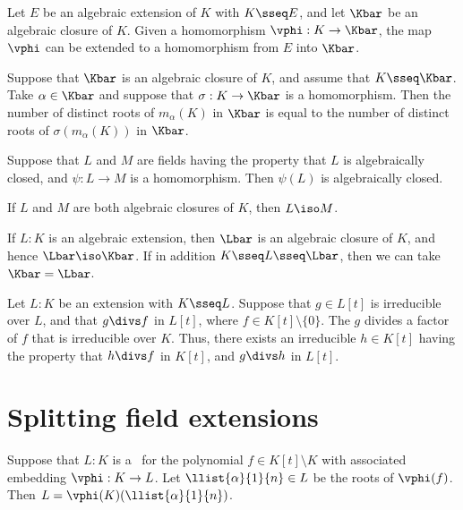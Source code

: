 \documentclass{article}
\begin{document}
  \begin{theorem}
    Let $E$ be an algebraic extension of $K$ with $K\sseq E$, and let $\Kbar$ be an algebraic closure of $K$. Given a homomorphism $\vphi:K\to \Kbar$, the map $\vphi$ can be extended to a homomorphism from $E$ into $\Kbar$.
  \end{theorem}

  \begin{corollary}
    Suppose that $\Kbar$ is an algebraic closure of $K$, and assume that $K\sseq \Kbar$. Take $\alpha\in \Kbar$ and suppose that $\sigma:K\to \Kbar$ is a homomorphism. Then the number of distinct roots of $m_\alpha(K)$ in $\Kbar$ is equal to the number of distinct roots of $\sigma(m_\alpha(K))$ in $\Kbar$.
  \end{corollary}

  \begin{proposition}
    Suppose that $L$ and $M$ are fields having the property that $L$ is algebraically closed, and $\psi : L \to M $ is a homomorphism. Then $\psi(L)$ is algebraically closed.
  \end{proposition}

  \begin{proposition}
    If $L$ and $M$ are both algebraic closures of $K$, then $L \iso M$.
  \end{proposition}

  \begin{proposition}
    If $L:K$ is an algebraic extension, then $\Lbar$ is an algebraic closure of $K$, and hence $\Lbar\iso\Kbar$. If in addition $K\sseq L\sseq \Lbar$, then we can take $\Kbar = \Lbar$.
  \end{proposition}

  \begin{proposition}
    Let $L:K$ be an extension with $K\sseq L$. Suppose that $g\in L[t]$ is irreducible over $L$, and that $g\divs f$ in $L[t]$, where $f\in K[t]\setminus \{ 0 \}$. The $g$ divides a factor of $f$ that is irreducible over $K$. Thus, there exists an irreducible $h\in K[t]$ having the property that $h\divs f$ in $K[t]$, and $g\divs h$ in $L[t]$.
  \end{proposition}

\section{Splitting field extensions}
  \begin{proposition}
    Suppose that $L:K$ is a \sfe~for the polynomial $f\in K[t]\setminus K$ with associated embedding $\vphi:K\to L$. Let $\llist{\alpha}{1}{n}\in L$ be the roots of $\vphi(f)$. Then $L=\vphi(K)(\llist{\alpha}{1}{n})$.
  \end{proposition}
\end{document}
